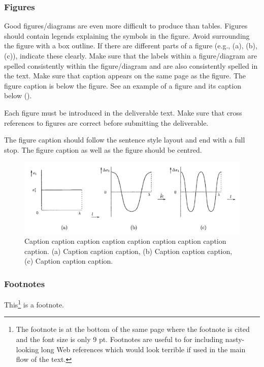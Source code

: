 \subsubsection{Figures}

Good figures/diagrams are even more difficult to produce than tables. Figures should contain legends explaining the symbols in the figure. Avoid surrounding the figure with a box outline. If there are different parts of a figure (e.g., (a), (b), (c)), indicate these clearly. Make sure that the labels within a figure/diagram are spelled consistently within the figure/diagram and are also consistently spelled in the text. Make sure that caption appears on the same page as the figure. The figure caption is below the figure. See an example of a figure and its caption below ().

Each figure must be introduced in the deliverable text. Make sure that cross references to figures are correct before submitting the deliverable.

The figure caption should follow the sentence style layout and end with a full stop. The figure caption as well as the figure should be centred.

\begin{figure}[htb]
	\centering
	\includegraphics[width=.89\linewidth]{graphics/figure}
	\caption{Caption caption caption caption caption caption caption caption caption. (a) Caption caption caption, (b) Caption caption caption, (c) Caption caption caption.}
	\label{fig:figure}
\end{figure}

\subsubsection{Footnotes}
\label{sec:footnotes}

This\footnote{The footnote is at the bottom of the same page where the footnote is cited and the font size is only 9 pt. Footnotes are useful to for including nasty-looking long Web references which would look terrible if used in the main flow of the text.} is a footnote.

